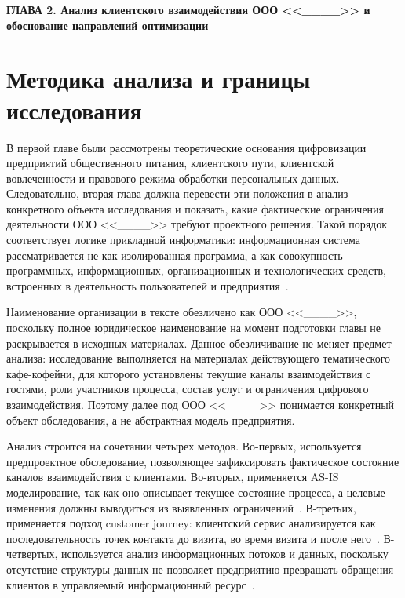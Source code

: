 \newpage
\begin{center}
  \textbf{\large ГЛАВА 2. Анализ клиентского взаимодействия ООО <<\_\_\_\_>> и обоснование направлений оптимизации}
\end{center}

\section{Методика анализа и границы исследования}

В первой главе были рассмотрены теоретические основания цифровизации предприятий общественного питания, клиентского пути, клиентской вовлеченности и правового режима обработки персональных данных. Следовательно, вторая глава должна перевести эти положения в анализ конкретного объекта исследования и показать, какие фактические ограничения деятельности ООО <<\_\_\_\_>> требуют проектного решения. Такой порядок соответствует логике прикладной информатики: информационная система рассматривается не как изолированная программа, а как совокупность программных, информационных, организационных и технологических средств, встроенных в деятельность пользователей и предприятия~\cite{utkin_baldin_2003,gost34003}.

Наименование организации в тексте обезличено как ООО <<\_\_\_\_>>, поскольку полное юридическое наименование на момент подготовки главы не раскрывается в исходных материалах. Данное обезличивание не меняет предмет анализа: исследование выполняется на материалах действующего тематического кафе-кофейни, для которого установлены текущие каналы взаимодействия с гостями, роли участников процесса, состав услуг и ограничения цифрового взаимодействия. Поэтому далее под ООО <<\_\_\_\_>> понимается конкретный объект обследования, а не абстрактная модель предприятия.

Анализ строится на сочетании четырех методов. Во-первых, используется предпроектное обследование, позволяющее зафиксировать фактическое состояние каналов взаимодействия с клиентами. Во-вторых, применяется AS-IS моделирование, так как оно описывает текущее состояние процесса, а целевые изменения должны выводиться из выявленных ограничений~\cite{ermilina2025,alieva2023}. В-третьих, применяется подход customer journey: клиентский сервис анализируется как последовательность точек контакта до визита, во время визита и после него~\cite{stickdorn2018,pantouvakis2022}. В-четвертых, используется анализ информационных потоков и данных, поскольку отсутствие структуры данных не позволяет предприятию превращать обращения клиентов в управляемый информационный ресурс~\cite{utkin_baldin_2003,gost34003}.

